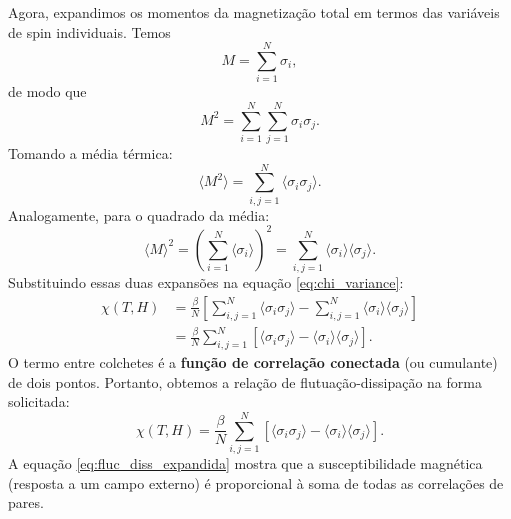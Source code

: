 \documentclass[11pt,a4paper]{article}
\begin{document}
%
Agora, expandimos os momentos da magnetização total em termos das variáveis de spin individuais. Temos
%
\begin{equation}
M = \sum_{i=1}^N \sigma_i,
\end{equation}
%
de modo que
%
\begin{equation}
M^2 = \sum_{i=1}^N \sum_{j=1}^N \sigma_i \sigma_j.
\end{equation}
%
Tomando a média térmica:
%
\begin{equation}
\langle M^2 \rangle = \sum_{i,j=1}^N \langle \sigma_i \sigma_j \rangle.
\end{equation}
%
Analogamente, para o quadrado da média:
%
\begin{equation}
\langle M \rangle^2 = \left( \sum_{i=1}^N \langle \sigma_i \rangle \right)^2
= \sum_{i,j=1}^N \langle \sigma_i \rangle \langle \sigma_j \rangle.
\end{equation}
%
Substituindo essas duas expansões na equação \eqref{eq:chi_variance}:
%
\begin{align}
\chi(T,H)
&= \frac{\beta}{N} \left[
\sum_{i,j=1}^N \langle \sigma_i \sigma_j \rangle
-
\sum_{i,j=1}^N \langle \sigma_i \rangle \langle \sigma_j \rangle
\right] \\
&= \frac{\beta}{N} \sum_{i,j=1}^N \left[
\langle \sigma_i \sigma_j \rangle - \langle \sigma_i \rangle \langle \sigma_j \rangle
\right].
\end{align}
%
O termo entre colchetes é a \textbf{função de correlação conectada} (ou cumulante) de dois pontos. Portanto, obtemos a relação de flutuação-dissipação na forma solicitada:
%
\begin{equation}
\boxed{
\chi(T,H)
= \frac{\beta}{N} \sum_{i,j=1}^N \left[
\langle \sigma_i \sigma_j \rangle - \langle \sigma_i \rangle \langle \sigma_j \rangle
\right].
}
\label{eq:fluc_diss_expandida}
\end{equation}
%
A equação \eqref{eq:fluc_diss_expandida} mostra que a susceptibilidade magnética (resposta a um campo externo) é proporcional à soma de todas as correlações de pares. 
%
\end{document}
